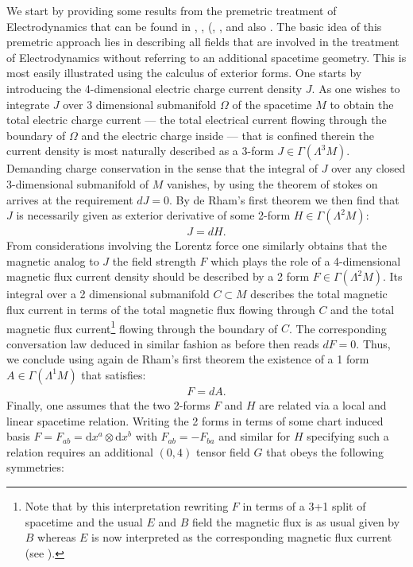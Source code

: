 We start by providing some results from the premetric treatment of Electrodynamics that can be found in \cite{1999PhLB..458..466O}, \cite{1999gr.qc....11096H}, (\cite{hehl2003foundations}, \cite{2006physics..10221H}, \cite{2004PhRvD..70j5022L} and also \cite{Hehl2005}. The basic idea of this premetric approach lies in describing all fields that are involved in the treatment of Electrodynamics without referring to an additional spacetime geometry. This is most easily illustrated using the calculus of exterior forms. One starts by introducing the 4-dimensional electric charge current density $J$. As one wishes to integrate $J$ over 3 dimensional submanifold $\Omega$ of the spacetime $M$ to obtain the total electric charge current --- the total electrical current flowing through the boundary of $\Omega$ and the electric charge inside --- that is confined therein the current density is most naturally described as a 3-form $J \in \Gamma(\Lambda^3M)$. Demanding charge conservation in the sense that the integral of $J$ over any closed 3-dimensional submanifold of $M$ vanishes, by using the theorem of stokes on arrives at the requirement $dJ =0$. By de Rham's first theorem we then find that $J$ is necessarily given as exterior derivative of some 2-form $H \in \Gamma(\Lambda^2M)$:
\begin{align}
    J = d H.
\end{align}
From considerations involving the Lorentz force one similarly obtains that the magnetic analog to $J$ the field strength $F$ which plays the role of a 4-dimensional magnetic flux current density should be described by a 2 form $F \in \Gamma(\Lambda^2M)$. Its integral over a 2 dimensional submanifold $C \subset M$ describes the total magnetic flux current in terms of the total magnetic flux flowing through $C$ and the total magnetic flux current\footnote{Note that by this interpretation rewriting $F$ in terms of a 3+1 split of spacetime and the usual $E$ and $B$ field the magnetic flux is as usual given by $B$ whereas $E$ is now interpreted as the corresponding magnetic flux current (see \cite{2006physics..10221H}).} flowing through the boundary of $C$. The corresponding conversation law deduced in similar fashion as before then reads $dF =0$. Thus, we conclude using again de Rham's first theorem the existence of a 1 form $A \in \Gamma(\Lambda^1M)$ that satisfies:
\begin{align}
    F = d A.
\end{align}
Finally, one assumes that the two 2-forms $F$ and $H$ are related via a local and linear spacetime relation. Writing the 2 forms in terms of some chart induced basis $F = F_{ab} = \mathrm{d}x^a \otimes \mathrm{d}x^b$ with $F_{ab} = - F_{ba}$ and similar for $H$ specifying such a relation requires an additional $(0,4)$ tensor field $G$ that obeys the following symmetries:
